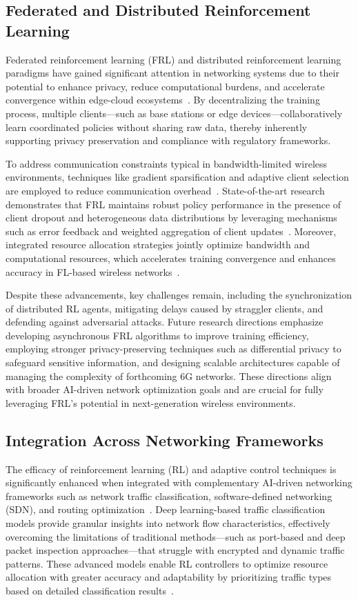 \documentclass[sigconf]{acmart}
\begin{document}
\subsection{Federated and Distributed Reinforcement Learning}

Federated reinforcement learning (FRL) and distributed reinforcement learning paradigms have gained significant attention in networking systems due to their potential to enhance privacy, reduce computational burdens, and accelerate convergence within edge-cloud ecosystems~\cite{ref49,ref50}. By decentralizing the training process, multiple clients—such as base stations or edge devices—collaboratively learn coordinated policies without sharing raw data, thereby inherently supporting privacy preservation and compliance with regulatory frameworks.

To address communication constraints typical in bandwidth-limited wireless environments, techniques like gradient sparsification and adaptive client selection are employed to reduce communication overhead~\cite{ref49}. State-of-the-art research demonstrates that FRL maintains robust policy performance in the presence of client dropout and heterogeneous data distributions by leveraging mechanisms such as error feedback and weighted aggregation of client updates~\cite{ref49}. Moreover, integrated resource allocation strategies jointly optimize bandwidth and computational resources, which accelerates training convergence and enhances accuracy in FL-based wireless networks~\cite{ref50}.

Despite these advancements, key challenges remain, including the synchronization of distributed RL agents, mitigating delays caused by straggler clients, and defending against adversarial attacks. Future research directions emphasize developing asynchronous FRL algorithms to improve training efficiency, employing stronger privacy-preserving techniques such as differential privacy to safeguard sensitive information, and designing scalable architectures capable of managing the complexity of forthcoming 6G networks. These directions align with broader AI-driven network optimization goals and are crucial for fully leveraging FRL’s potential in next-generation wireless environments.

\subsection{Integration Across Networking Frameworks}

The efficacy of reinforcement learning (RL) and adaptive control techniques is significantly enhanced when integrated with complementary AI-driven networking frameworks such as network traffic classification, software-defined networking (SDN), and routing optimization~\cite{ref51,ref52,ref53}. Deep learning-based traffic classification models provide granular insights into network flow characteristics, effectively overcoming the limitations of traditional methods—such as port-based and deep packet inspection approaches—that struggle with encrypted and dynamic traffic patterns. These advanced models enable RL controllers to optimize resource allocation with greater accuracy and adaptability by prioritizing traffic types based on detailed classification results~\cite{ref51}.
\end{document}
